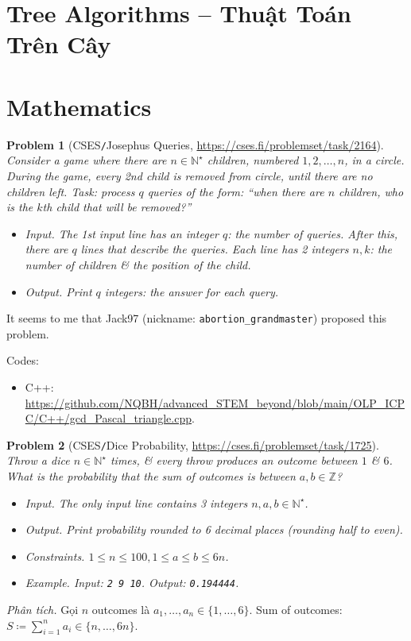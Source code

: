 \documentclass{article}
\newtheorem{problem}{Problem}
\begin{document}

\section{Tree Algorithms -- Thuật Toán Trên Cây}


\section{Mathematics}

\begin{problem}[CSES{\tt/}Josephus Queries, \url{https://cses.fi/problemset/task/2164}]
    Consider a game where there are $n\in\mathbb{N}^\star$ children, numbered $1,2,\ldots,n$, in a circle. During the game, every 2nd child is removed from circle, until there are no children left. Task: process $q$ queries of the form: ``when there are $n$ children, who is the $k$th child that will be removed?''
    \begin{itemize}
        \item {\sf Input.} The 1st input line has an integer $q$: the number of queries. After this, there are $q$ lines that describe the queries. Each line has 2 integers $n,k$: the number of children \& the position of the child.
        \item {\sf Output.} Print $q$ integers: the answer for each query.
    \end{itemize}
\end{problem}
It seems to me that {\sf Jack97} (nickname: \verb|abortion_grandmaster|) proposed this problem.

Codes:
\begin{itemize}
    \item C++: \url{https://github.com/NQBH/advanced_STEM_beyond/blob/main/OLP_ICPC/C++/gcd_Pascal_triangle.cpp}.
\end{itemize}

\begin{problem}[CSES{\tt/}Dice Probability, \url{https://cses.fi/problemset/task/1725}]
    Throw a dice $n\in\mathbb{N}^\star$ times, \& every throw produces an outcome between $1$ \& $6$. What is the probability that the sum of outcomes is between $a,b\in\mathbb{Z}$?
    \begin{itemize}
        \item {\sf Input.} The only input line contains 3 integers $n,a,b\in\mathbb{N}^\star$.
        \item {\sf Output.} Print probability rounded to 6 decimal places (rounding half to even).
        \item {\sf Constraints.} $1\le n\le100,1\le a\le b\le6n$.
        \item {\sf Example.} Input: {\tt2 9 10}. Output: {\tt0.194444}.
    \end{itemize}
\end{problem}
{\it Phân tích.} Gọi $n$ outcomes là $a_1,\ldots,a_n\in\{1,\ldots,6\}$. Sum of outcomes: $S\coloneqq\sum_{i=1}^n a_i\in\{n,\ldots,6n\}$.
\end{document}
